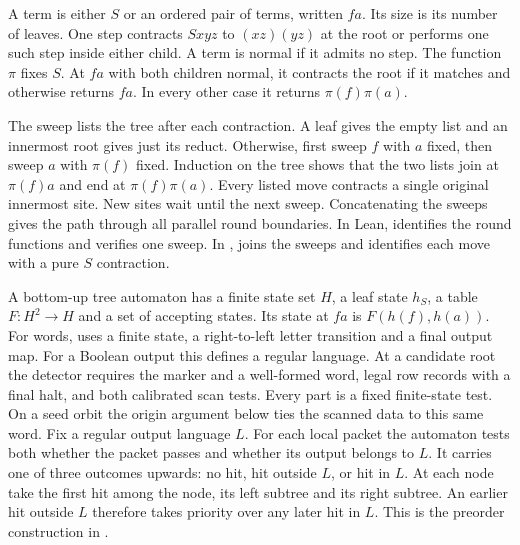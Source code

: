 A term is either $S$ or an ordered pair of terms, written $fa$.
Its size is its number of leaves. One step contracts $Sxyz$ to $(xz)(yz)$
at the root or performs one such step inside either child.
A term is normal if it admits no step. The function $\pi$ fixes $S$.
At $fa$ with both children normal, it contracts the root if it matches and
otherwise returns $fa$. In every other case it returns $\pi(f)\pi(a)$.

The sweep lists the tree after each contraction. A leaf gives the empty list and an innermost root gives just its reduct.
Otherwise, first sweep $f$ with $a$ fixed, then sweep $a$ with $\pi(f)$
fixed. Induction on the tree shows that the two lists join at
$\pi(f)a$ and end at $\pi(f)\pi(a)$. Every listed move contracts a single
original innermost site. New sites wait until the next sweep. Concatenating
the sweeps gives the path through all parallel round boundaries.
In Lean,  identifies
the round functions and
 verifies one
sweep. In ,  joins
the sweeps and  identifies each move with a pure
$S$ contraction.

A bottom-up tree automaton has a finite state set $H$, a leaf state $h_S$,
a table $F:H^2\to H$ and a set of accepting states.
Its state at $fa$ is $F(h(f),h(a))$. For words, 
uses a finite state, a right-to-left letter transition and a final output
map. For a Boolean output this defines a regular language.
At a candidate root the detector requires the marker and a well-formed
word, legal row records with a final halt, and both calibrated scan tests.
Every part is a fixed finite-state test. On a seed orbit the origin
argument below ties the scanned data to this same word.
Fix a regular output language $L$. For each local packet the automaton tests both
whether the packet passes and whether its output belongs to $L$.
It carries one of three outcomes upwards: no hit, hit outside $L$, or hit
in $L$. At each node take the first hit among the node, its left subtree
and its right subtree. An earlier hit outside $L$ therefore takes priority
over any later hit in $L$. This is the preorder construction in
.

